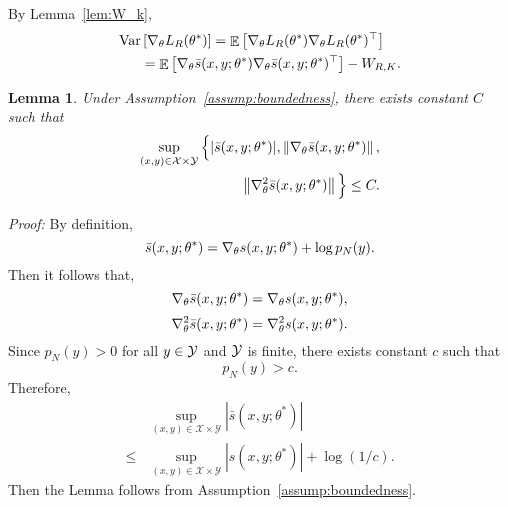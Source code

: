 \documentclass[11pt,a4paper]{article}
\DeclareMathOperator{\E}{\mathbb{E}}
\newcommand{\var}{\operatorname{Var}}
\newcommand{\gtheta}{\ensuremath \nabla_{\theta}}
\newcommand{\str}[3]{s(#1, #2; #3)}
\newcommand{\ssf}[3]{\bar{s}(#1, #2; #3)}
\newcommand{\vnorm}[1]{\left\| #1 \right\|}
\newtheorem{lemma}{Lemma}[section]
\begin{document}
By Lemma~\ref{lem:W_k}, 
\begin{equation*}
\begin{aligned}
     \var & \left[\gtheta L_R(\theta^*) \right]  = \E \left[\gtheta L_R(\theta^*) \gtheta L_R(\theta^*)^\top\right] \\
     &   = \E \left[\gtheta \ssf{x}{y}{\theta^*}\gtheta \ssf{x}{y}{\theta^*}^\top\right] - W_{R, K}. 
\end{aligned}
\end{equation*}





 \begin{lemma} Under Assumption~\ref{assump:boundedness}, there exists constant $C$ such that
\begin{equation*}
\begin{aligned}
\sup_{(x, y)\in\mathcal{X}\times \mathcal{Y}} \Big\{ |\ssf{x}{y}{\theta^*}|, \vnorm{\gtheta \ssf{x}{y}{\theta^*}},  \\
\vnorm{\gtheta^2 \ssf{x}{y}{\theta^*}}\Big\} \leq C.  
\end{aligned}
\end{equation*}
 \label{lem:boundedness}
 \end{lemma}

{\em Proof: } By definition, 
\[
\ssf{x}{y}{\theta^*} = \gtheta \str{x}{y}{\theta^*} + \log p_N(y).
\]
Then it follows that,
\[
\gtheta \ssf{x}{y}{\theta^*} = \gtheta \str{x}{y}{\theta^*},
\]
\[
\gtheta^2 \ssf{x}{y}{\theta^*} = \gtheta^2 \str{x}{y}{\theta^*}. 
\]
Since $p_N(y) > 0$ for all $y\in {\cal Y}$ and ${\cal Y}$ is finite, there exists constant $c$ such that
\[
p_N(y) > c.
\]
Therefore, 
\begin{equation*}
\begin{aligned}
& \sup_{(x, y)\in\mathcal{X}\times \mathcal{Y}}  |\ssf{x}{y}{\theta^*}| \\
\leq & \sup_{(x, y)\in\mathcal{X}\times \mathcal{Y}}  |\str{x}{y}{\theta^*}| + \log(1/c). 
\end{aligned}
\end{equation*}
Then the Lemma follows from Assumption~\ref{assump:boundedness}.
\end{document}
